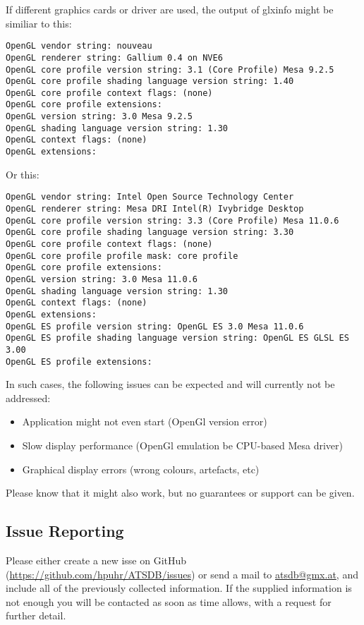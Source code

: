If different graphics cards or driver are used, the output of glxinfo might be similiar to this:

\begin{verbatim}
OpenGL vendor string: nouveau
OpenGL renderer string: Gallium 0.4 on NVE6
OpenGL core profile version string: 3.1 (Core Profile) Mesa 9.2.5
OpenGL core profile shading language version string: 1.40
OpenGL core profile context flags: (none)
OpenGL core profile extensions:
OpenGL version string: 3.0 Mesa 9.2.5
OpenGL shading language version string: 1.30
OpenGL context flags: (none)
OpenGL extensions:
\end{verbatim}

Or this:

\begin{verbatim}
OpenGL vendor string: Intel Open Source Technology Center
OpenGL renderer string: Mesa DRI Intel(R) Ivybridge Desktop 
OpenGL core profile version string: 3.3 (Core Profile) Mesa 11.0.6
OpenGL core profile shading language version string: 3.30
OpenGL core profile context flags: (none)
OpenGL core profile profile mask: core profile
OpenGL core profile extensions:
OpenGL version string: 3.0 Mesa 11.0.6
OpenGL shading language version string: 1.30
OpenGL context flags: (none)
OpenGL extensions:
OpenGL ES profile version string: OpenGL ES 3.0 Mesa 11.0.6
OpenGL ES profile shading language version string: OpenGL ES GLSL ES 3.00
OpenGL ES profile extensions:
\end{verbatim}

In such cases, the following issues can be expected and will currently not be addressed:

\begin{itemize} 
\item Application might not even start (OpenGl version error)
\item Slow display performance (OpenGl emulation be CPU-based Mesa driver)
\item Graphical display errors (wrong colours, artefacts, etc) 
\end{itemize} 

Please know that it might also work, but no guarantees or support can be given.

\subsection{Issue Reporting}

Please either create a new isse on GitHub (\url{https://github.com/hpuhr/ATSDB/issues}) or send a mail to \href{mailto:atsdb@gmx.at}{atsdb@gmx.at}, and include all of the previously collected information. If the supplied information is not enough you will be contacted as soon as time allows, with a request for further detail.


